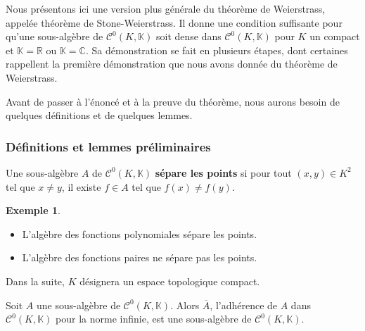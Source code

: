 \documentclass[french]{article}
\newcommand{\R}{\mathbb{R}}
\newcommand{\C}{\mathbb{C}}
\newcommand{\K}{\mathbb{K}}
\theoremstyle{plain}
\theoremstyle{definition}
\newtheorem*{ex}{Exemple}
\theoremstyle{remark}
\begin{document}
Nous présentons ici une version plus générale du théorème de Weierstrass, appelée théorème de Stone-Weierstrass. Il donne une condition suffisante pour qu'une sous-algèbre de $\mathcal{C}^0(K,\K)$ soit dense dans $\mathcal{C}^0(K,\K)$ pour $K$ un compact et $\K=\R$ ou $\K=\C$. Sa démonstration se fait en plusieurs étapes, dont certaines rappellent la première démonstration que nous avons donnée du théorème de Weierstrass.

Avant de passer à l'énoncé et à la preuve du théorème, nous aurons besoin de quelques définitions et de quelques lemmes.

\subsubsection*{Définitions et lemmes préliminaires}

\begin{dfn}
	Une sous-algèbre $A$ de $\mathcal{C}^0(K,\K)$ \textbf{sépare les points} si pour tout $(x,y)\in K^2$ tel que $x\ne y$, il existe $f\in A$ tel que $f(x)\ne f(y)$.
\end{dfn}

\begin{ex}
	\begin{itemize}
		\item L'algèbre des fonctions polynomiales sépare les points.
		\item L'algèbre des fonctions paires ne sépare pas les points.
	\end{itemize}
\end{ex}

Dans la suite, $K$ désignera un espace topologique compact.

\begin{lem}%
	Soit $A$ une sous-algèbre de $\mathcal{C}^0(K,\K)$. Alors $\overline{A}$, l'adhérence de $A$ dans $\mathcal{C}^0(K,\K)$ pour la norme infinie, est une sous-algèbre de $\mathcal{C}^0(K,\K)$.
\end{lem}
\end{document}
